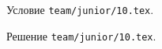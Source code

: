 \problem{}
Условие \texttt{team/junior/10.tex}.

\solution Решение \texttt{team/junior/10.tex}.
\endproblem
